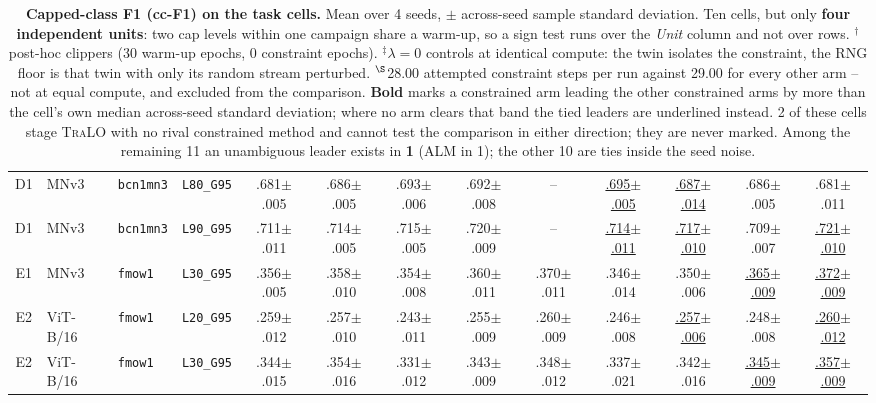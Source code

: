 \begin{table}[t]
{\begin{tabular}{cllc ccccccccc}
\midrule
D1 & MNv3 & \texttt{bcn1mn3} & \texttt{L80\_G95} & .681{\tiny $\pm$.005} & .686{\tiny $\pm$.005} & .693{\tiny $\pm$.006} & .692{\tiny $\pm$.008} & -- & \underline{.695{\tiny $\pm$.005}} & \underline{.687{\tiny $\pm$.014}} & .686{\tiny $\pm$.005} & .681{\tiny $\pm$.011} \\
D1 & MNv3 & \texttt{bcn1mn3} & \texttt{L90\_G95} & .711{\tiny $\pm$.011} & .714{\tiny $\pm$.005} & .715{\tiny $\pm$.005} & .720{\tiny $\pm$.009} & -- & \underline{.714{\tiny $\pm$.011}} & \underline{.717{\tiny $\pm$.010}} & .709{\tiny $\pm$.007} & \underline{.721{\tiny $\pm$.010}} \\
\midrule
E1 & MNv3 & \texttt{fmow1} & \texttt{L30\_G95} & .356{\tiny $\pm$.005} & .358{\tiny $\pm$.010} & .354{\tiny $\pm$.008} & .360{\tiny $\pm$.011} & .370{\tiny $\pm$.011} & .346{\tiny $\pm$.014} & .350{\tiny $\pm$.006} & \underline{.365{\tiny $\pm$.009}} & \underline{.372{\tiny $\pm$.009}} \\
\midrule
E2 & ViT-B/16 & \texttt{fmow1} & \texttt{L20\_G95} & .259{\tiny $\pm$.012} & .257{\tiny $\pm$.010} & .243{\tiny $\pm$.011} & .255{\tiny $\pm$.009} & .260{\tiny $\pm$.009} & .246{\tiny $\pm$.008} & \underline{.257{\tiny $\pm$.006}} & .248{\tiny $\pm$.008} & \underline{.260{\tiny $\pm$.012}} \\
E2 & ViT-B/16 & \texttt{fmow1} & \texttt{L30\_G95} & .344{\tiny $\pm$.015} & .354{\tiny $\pm$.016} & .331{\tiny $\pm$.012} & .343{\tiny $\pm$.009} & .348{\tiny $\pm$.012} & .337{\tiny $\pm$.021} & .342{\tiny $\pm$.016} & \underline{.345{\tiny $\pm$.009}} & \underline{.357{\tiny $\pm$.009}} \\
\bottomrule
\end{tabular}}
\caption{\textbf{Capped-class F1 (cc-F1) on the task cells.} Mean over 4 seeds, $\pm$ across-seed sample standard deviation. Ten cells, but only \textbf{four independent units}: two cap levels within one campaign share a warm-up, so a sign test runs over the \emph{Unit} column and not over rows. $^{\dagger}$post-hoc clippers (30 warm-up epochs, 0 constraint epochs). $^{\ddagger}$$\lambda{=}0$ controls at identical compute: the twin isolates the constraint, the RNG floor is that twin with only its random stream perturbed. $^{\S}$28.00 attempted constraint steps per run against 29.00 for every other arm -- not at equal compute, and excluded from the comparison. \textbf{Bold} marks a constrained arm leading the other constrained arms by more than the cell's own median across-seed standard deviation; where no arm clears that band the tied leaders are underlined instead. 2 of these cells stage \textsc{TraLO} with no rival constrained method and cannot test the comparison in either direction; they are never marked. Among the remaining 11 an unambiguous leader exists in \textbf{1} (ALM in 1); the other 10 are ties inside the seed noise.}
\label{tab:taskcell-ccf1}
\end{table}
